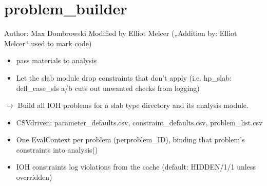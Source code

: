 \documentclass[a4paper,11pt,german]{sphinxmanual}
\begin{document}
\section{problem\_builder}
\label{\detokenize{api/ioh_core:module-core.ioh_core.problem_builder}}\label{\detokenize{api/ioh_core:problem-builder}}
\sphinxAtStartPar
Author: Max Dombrowski
Modified by Elliot Melcer („Addition by: Elliot Melcer“ used to mark code)
\begin{itemize}
\item {} 
\sphinxAtStartPar
pass materials to analysis

\item {} 
\sphinxAtStartPar
Let the slab module drop constraints that don’t apply (i.e. hp\_slab: defl\_case\_sls a/b cuts out unwanted checks from logging)

\end{itemize}

\begin{fulllineitems}
\label{\detokenize{api/ioh_core:core.ioh_core.problem_builder.build_problems_for_slab}}
\pysigstartsignatures
\pysiglinewithargsret
{}
{\sphinxparamcomma {}}
{{ $\rightarrow$ \DUrole{p}{{[}}\DUrole{p}{{]}}}}
\pysigstopsignatures
\sphinxAtStartPar
Build all IOH problems for a slab type directory and its analysis module.
\begin{itemize}
\item {} 
\sphinxAtStartPar
CSV\sphinxhyphen{}driven: parameter\_defaults.csv, constraint\_defaults.csv, problem\_list.csv

\item {} 
\sphinxAtStartPar
One EvalContext per problem (per\sphinxhyphen{}problem\_ID), binding that problem’s constraints into analysis()

\item {} 
\sphinxAtStartPar
IOH constraints log  violations from the cache (default: HIDDEN/1/1 unless overridden)

\end{itemize}

\end{fulllineitems}
\end{document}
